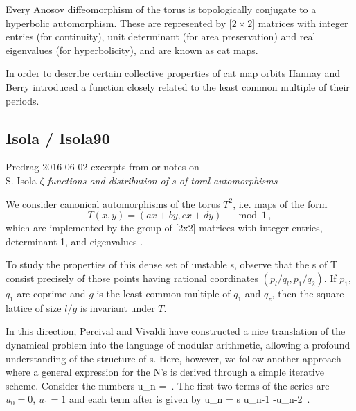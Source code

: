 Every Anosov diffeomorphism of the torus is topologically conjugate to a
hyperbolic automorphism. These are represented by [$2\!\times\!2$] matrices with
integer entries (for continuity), unit determinant (for area
preservation) and real eigenvalues (for hyperbolicity), and are known as
cat maps.

In order to describe certain collective properties of cat map orbits
Hannay and Berry introduced a function  closely related to
the least common multiple of their periods.



\subsection{Isola / Isola90}
\label{sect:Isola90}

Predrag 2016-06-02 excerpts from or notes on\\
S. Isola
{\em {$\zeta$}-functions and distribution of \po s of toral automorphisms}


We consider canonical automorphisms of the torus $T^2$, i.e. maps of the form
\[
T(x, y) = (ax + by, cx + dy)\quad \mod 1
\,,
\]
which are implemented by the group of [2x2] matrices with integer entries,
determinant 1, and eigenvalues .

To study the properties of this dense set of unstable \po s,
observe that the \po s of T consist precisely of those points
having rational coordinates $(p_l/q_l, p_1/q_2)$.
If $p_1$, $q_1$ are coprime and $g$ is the least common multiple of $q_1$
and $q_z$, then the square lattice of size $l/g$ is invariant under $T$.

In this direction, Percival and Vivaldi have
constructed a nice translation of the dynamical problem into the language
of modular arithmetic, allowing a profound understanding of the structure
of {\po s}.
Here, however, we follow another approach where a general expression for
the N's is derived through a simple iterative scheme.
Consider the numbers
\beq
u_n = 
 \,.
The first two terms of the series are $u_0 = 0$, $u_1 = 1$ and each term after
is given by
\beq
u_n = s u_{n-1} -u_{n-2}
 \,.


